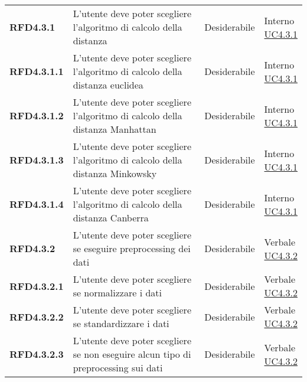 \begin{longtable}[H]{| >{\raggedright\bfseries}m{20mm} | >{\raggedright}m{90mm} | >{\centering}m{25mm} | >{\centering\arraybackslash}m{30mm}|}
    RFD4.3.1
    & L'utente deve poter scegliere l'algoritmo di calcolo della distanza
    & Desiderabile
    & \makecell{ Interno \\ \hyperref[par:uc4.3.1]{UC4.3.1} }\\

    RFD4.3.1.1
    & L'utente deve poter scegliere l'algoritmo di calcolo della distanza euclidea
    & Desiderabile
    & \makecell{ Interno \\ \hyperref[par:uc4.3.1]{UC4.3.1} }\\

    RFD4.3.1.2
    & L'utente deve poter scegliere l'algoritmo di calcolo della distanza Manhattan
    & Desiderabile
    & \makecell{ Interno \\ \hyperref[par:uc4.3.1]{UC4.3.1} }\\

    RFD4.3.1.3
    & L'utente deve poter scegliere l'algoritmo di calcolo della distanza Minkowsky
    & Desiderabile
    & \makecell{ Interno \\ \hyperref[par:uc4.3.1]{UC4.3.1} }\\

    RFD4.3.1.4
    & L'utente deve poter scegliere l'algoritmo di calcolo della distanza Canberra
    & Desiderabile
    & \makecell{ Interno \\ \hyperref[par:uc4.3.1]{UC4.3.1} }\\

    RFD4.3.2
    & L'utente deve poter scegliere se eseguire preprocessing dei dati
    & Desiderabile
    & \makecell{ Verbale \\ \hyperref[par:uc4.3.2]{UC4.3.2} }\\

    RFD4.3.2.1
    & L'utente deve poter scegliere se normalizzare i dati
    & Desiderabile
    & \makecell{ Verbale \\ \hyperref[par:uc4.3.2]{UC4.3.2} }\\

    RFD4.3.2.2
    & L'utente deve poter scegliere se standardizzare i dati
    & Desiderabile
    & \makecell{ Verbale \\ \hyperref[par:uc4.3.2]{UC4.3.2} }\\

    RFD4.3.2.3
    & L'utente deve poter scegliere se non eseguire alcun tipo di preprocessing sui dati
    & Desiderabile
    & \makecell{ Verbale \\ \hyperref[par:uc4.3.2]{UC4.3.2} }\\



\end{longtable}
